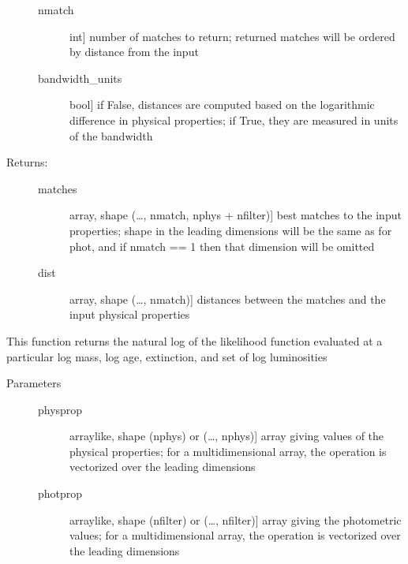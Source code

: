 \documentclass[letterpaper,10pt,english]{sphinxmanual}
\begin{document}
\begin{fulllineitems}
\begin{fulllineitems}
\begin{description}
\begin{description}
\item[{nmatch}] \leavevmode{[}int{]}
number of matches to return; returned matches will be
ordered by distance from the input

\item[{bandwidth\_units}] \leavevmode{[}bool{]}
if False, distances are computed based on the
logarithmic difference in physical properties; if True,
they are measured in units of the bandwidth

\end{description}

\item[{Returns:}] \leavevmode\begin{description}
\item[{matches}] \leavevmode{[}array, shape (…, nmatch, nphys + nfilter){]}
best matches to the input properties; shape in the
leading dimensions will be the same as for phot, and if
nmatch == 1 then that dimension will be omitted

\item[{dist}] \leavevmode{[}array, shape (…, nmatch){]}
distances between the matches and the input physical
properties

\end{description}

\end{description}

\end{fulllineitems}


\begin{fulllineitems}
\label{\detokenize{bayesphot:slugpy.bayesphot.bp.bp.logL}}
This function returns the natural log of the likelihood
function evaluated at a particular log mass, log age,
extinction, and set of log luminosities
\begin{description}
\item[{Parameters}] \leavevmode\begin{description}
\item[{physprop}] \leavevmode{[}arraylike, shape (nphys) or (…, nphys){]}
array giving values of the physical properties; for a
multidimensional array, the operation is vectorized over
the leading dimensions

\item[{photprop}] \leavevmode{[}arraylike, shape (nfilter) or (…, nfilter){]}
array giving the photometric values; for a
multidimensional array, the operation is vectorized over
the leading dimensions


\end{description}
\end{description}
\end{fulllineitems}
\end{fulllineitems}
\end{document}
